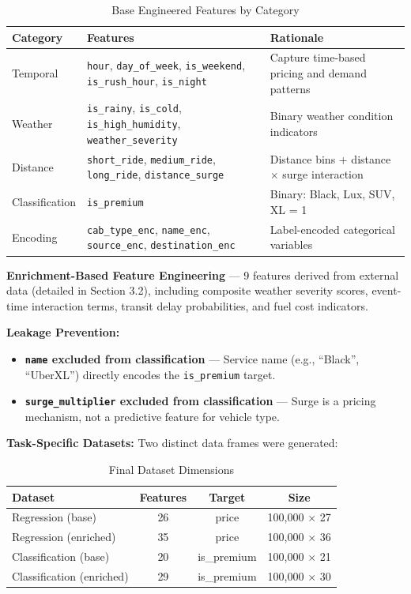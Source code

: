 \documentclass[12pt,a4paper]{article}
\begin{document}
\begin{table}[H]
\centering
\caption{Base Engineered Features by Category}
\begin{tabular}{lp{4cm}p{5.5cm}}
\toprule
\textbf{Category} & \textbf{Features} & \textbf{Rationale} \\
\midrule
Temporal & \texttt{hour}, \texttt{day\_of\_week}, \texttt{is\_weekend}, \texttt{is\_rush\_hour}, \texttt{is\_night} & Capture time-based pricing and demand patterns \\
Weather & \texttt{is\_rainy}, \texttt{is\_cold}, \texttt{is\_high\_humidity}, \texttt{weather\_severity} & Binary weather condition indicators \\
Distance & \texttt{short\_ride}, \texttt{medium\_ride}, \texttt{long\_ride}, \texttt{distance\_surge} & Distance bins + distance $\times$ surge interaction \\
Classification & \texttt{is\_premium} & Binary: Black, Lux, SUV, XL = 1 \\
Encoding & \texttt{cab\_type\_enc}, \texttt{name\_enc}, \texttt{source\_enc}, \texttt{destination\_enc} & Label-encoded categorical variables \\
\bottomrule
\end{tabular}
\end{table}

\textbf{Enrichment-Based Feature Engineering} --- 9 features derived from external data (detailed in Section 3.2), including composite weather severity scores, event-time interaction terms, transit delay probabilities, and fuel cost indicators.

\textbf{Leakage Prevention:}
\begin{itemize}
    \item \textbf{\texttt{name} excluded from classification} --- Service name (e.g., ``Black'', ``UberXL'') directly encodes the \texttt{is\_premium} target.
    \item \textbf{\texttt{surge\_multiplier} excluded from classification} --- Surge is a pricing mechanism, not a predictive feature for vehicle type.
\end{itemize}

\textbf{Task-Specific Datasets:} Two distinct data frames were generated:

\begin{table}[H]
\centering
\caption{Final Dataset Dimensions}
\begin{tabular}{lccc}
\toprule
\textbf{Dataset} & \textbf{Features} & \textbf{Target} & \textbf{Size} \\
\midrule
Regression (base) & 26 & price & 100,000 $\times$ 27 \\
Regression (enriched) & 35 & price & 100,000 $\times$ 36 \\
Classification (base) & 20 & is\_premium & 100,000 $\times$ 21 \\
Classification (enriched) & 29 & is\_premium & 100,000 $\times$ 30 \\
\bottomrule
\end{tabular}
\end{table}
\end{document}
